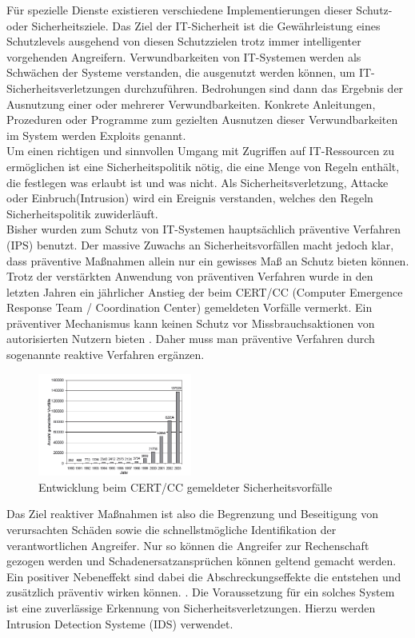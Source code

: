 \documentclass[11pt]{scrartcl}
\begin{document}
Für spezielle Dienste existieren verschiedene Implementierungen dieser
Schutz- oder Sicherheitsziele. Das Ziel der IT-Sicherheit ist die Gewährleistung eines Schutzlevels ausgehend von diesen Schutzzielen trotz  immer intelligenter vorgehenden Angreifern.
Verwundbarkeiten von IT-Systemen werden als Schwächen
der Systeme verstanden, die ausgenutzt werden können, um IT-Sicherheitsverletzungen
durchzuführen. Bedrohungen sind dann das Ergebnis der Ausnutzung einer oder mehrerer Verwundbarkeiten. Konkrete Anleitungen, Prozeduren oder Programme zum gezielten Ausnutzen dieser Verwundbarkeiten im System werden  Exploits genannt.\\
Um einen richtigen und sinnvollen Umgang mit Zugriffen auf IT-Ressourcen zu ermöglichen ist eine Sicherheitspolitik nötig, die eine Menge von Regeln enthält, die festlegen was erlaubt ist und was nicht. Als Sicherheitsverletzung, Attacke oder Einbruch(Intrusion) wird ein Ereignis verstanden, welches den Regeln Sicherheitspolitik zuwiderläuft.\\
Bisher wurden zum Schutz von IT-Systemen hauptsächlich präventive Verfahren (IPS) benutzt. Der massive Zuwachs an Sicherheitsvorfällen macht jedoch klar, dass präventive Maßnahmen allein nur ein gewisses Maß an Schutz bieten können.
Trotz der verstärkten Anwendung von präventiven Verfahren wurde in den letzten Jahren ein jährlicher Anstieg der beim CERT/CC (Computer Emergence Response
Team / Coordination Center) gemeldeten Vorfälle vermerkt. Ein präventiver Mechanismus kann keinen Schutz vor Missbrauchsaktionen von autorisierten Nutzern bieten \cite{2}. Daher muss man präventive Verfahren durch sogenannte reaktive Verfahren ergänzen.\\
\begin{figure}
\includegraphics[width=0.45\textwidth]{aa2.png}
	\caption{Entwicklung beim CERT/CC gemeldeter Sicherheitsvorfälle \cite{5}}
	\label{fig1}
\end{figure} \noindent

Das Ziel reaktiver Maßnahmen ist also die Begrenzung und Beseitigung von verursachten Schäden sowie die schnellstmögliche Identifikation der verantwortlichen Angreifer. Nur so können die Angreifer zur Rechenschaft gezogen werden und Schadenersatzansprüchen können geltend gemacht werden. Ein positiver Nebeneffekt sind dabei die Abschreckungseffekte die entstehen und zusätzlich präventiv wirken können. \cite{2}. Die Voraussetzung für ein solches System ist eine zuverlässige Erkennung von Sicherheitsverletzungen. Hierzu werden Intrusion Detection Systeme (IDS) verwendet.\cite{3}\cite{4}\cite{5}
\end{document}
